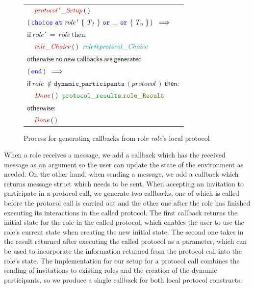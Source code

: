 \documentclass[12pt,twoside]{report}
\begin{document}
\begin{figure}[!h]
\begin{center}
\begin{tabular}{l}
            $\quad \functionname{protocol\,'\_Setup}\,(\,)$\\[15pt]

            $(\,\choice\ \at\ \mathit{role\,'}\ \{\;\mathit{T_1}\;\}\ \scror\ ...\ \scror\ \{\;\mathit{T_n}\;\}\,)\ \implies$\\[6pt]
            $\text{if}\ \mathit{role'\ =\ role}\ \text{then:}$\\[4pt]
            
            $\quad \functionname{role\_Choice}\,(\,)\;\ \enumtype{\localprotocol{role}{protocol}\_Choice}$\\[10pt]
            $\mathsf{otherwise\ no\ new\ callbacks\ are\ generated}$\\[15pt]

            $(\,\scrend\,)\ \implies$\\[3pt] 
            
            $\mathsf{if}\ \mathit{role}\ \notin \mathtt{dynamic\_participants\,}\mathit{(protocol\,)}\ \mathsf{then}:$\\[4pt]
            
            $\quad \functionname{Done}\,(\,)\;\ \pkgstructaccess{protocol\_results}{role\_Result}$\\[6pt]
            
            $\mathsf{otherwise:}$\\[4pt]
            
            $\quad \functionname{Done}\,(\,)$\\[15pt]

        \end{tabular}
    \end{center}
    \caption{Process for generating callbacks from role \textit{role}'s local protocol}
    \label{callbacks-gen}
\end{figure}

When a role receives a message, we add a callback which has the received message as an argument so the user can update the state of the environment as needed. On the other hand, when sending a message, we add a callback which returns message struct which needs to be sent. When accepting an invitation to participate in a protocol call, we generate two callbacks, one of which is called before the protocol call is carried out and the other one after the role has finished executing its interactions in the called protocol. The first callback returns the initial state for the role in the called protocol, which enables the user to use the role's current state when creating the new initial state. The second one takes in the result returned after executing the called protocol as a parameter, which can be used to incorporate the information returned from the protocol call into the role's state. The implementation for our setup for a protocol call combines the sending of invitations to existing roles and the creation of the dynamic participants, so we produce a single callback for both local protocol constructs.
\end{document}
